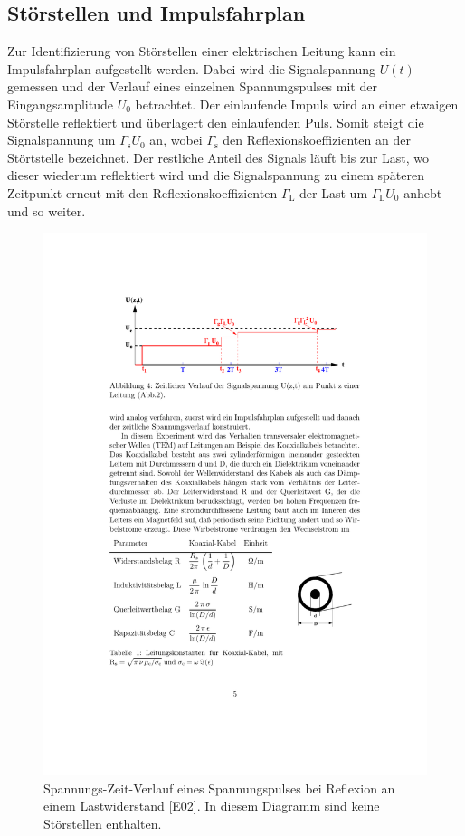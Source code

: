 \subsection{Störstellen und Impulsfahrplan} %
\label{sub:impulsfahrplan}
Zur Identifizierung von Störstellen einer elektrischen Leitung kann ein
Impulsfahrplan aufgestellt werden.
Dabei wird die Signalspannung $U(t)$ gemessen und der Verlauf eines einzelnen
Spannungspulses mit der Eingangsamplitude $U_0$ betrachtet.
Der einlaufende Impuls wird an einer etwaigen Störstelle reflektiert und
überlagert den einlaufenden Puls. Somit steigt die Signalspannung um
$\Gamma_\text{s}U_0$ an, wobei $\Gamma_\text{s}$ den Reflexionskoeffizienten
an der Störtstelle bezeichnet.
Der restliche Anteil des Signals läuft bis zur Last, wo dieser wiederum
reflektiert wird und die Signalspannung zu einem späteren Zeitpunkt erneut
mit den Reflexionskoeffizienten $\Gamma_\text{L}$ der Last um $\Gamma_\text{L}
U_0$ anhebt und so weiter.
\begin{figure}[b]
    \center
    \includegraphics[width=0.9\linewidth]{img/spannung-zeit.pdf}
    \caption{
        Spannungs-Zeit-Verlauf eines Spannungspulses bei Reflexion an einem
        Lastwiderstand [E02].
        In diesem Diagramm sind keine Störstellen enthalten.
    }
    \label{fig:spannung-zeit}
\end{figure}


